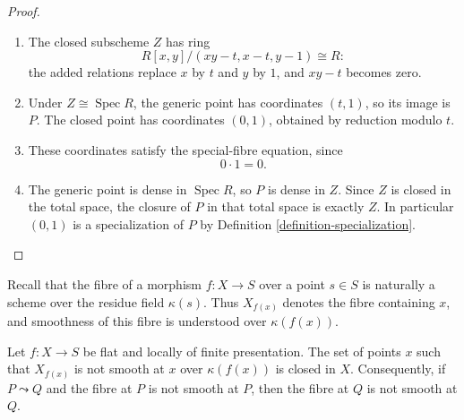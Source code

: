 \begin{proof}
\begin{enumerate}
To connect this with the definition of
the residue field, localizing at $P$
inverts every $g\notin\mathfrak{m}_P$,
that is, every $g$ with $g(t,1)\neq0$.
Evaluation therefore extends to
$$
B_{\mathfrak{m}_P}\longrightarrow K,
\qquad
\frac{f}{g}\longmapsto
\frac{f(t,1)}{g(t,1)}.
$$
This map is surjective, since constants
already give all of $K$.
Its value is zero exactly when
$f(t,1)=0$, or $f\in\mathfrak{m}_P$.
Its kernel is therefore
$\mathfrak{m}_P B_{\mathfrak{m}_P}$.
Thus
$$
\begin{aligned}
\kappa(P)
&=B_{\mathfrak{m}_P}/
  \mathfrak{m}_P B_{\mathfrak{m}_P}\\
&\cong B/\mathfrak{m}_P
\cong K.
\end{aligned}
$$
Localizing can change the ring, but
does not change this quotient:
the denominators already become
nonzero, hence invertible, elements
of the field $K$.
\item The closed subscheme $Z$ has ring
$$
R[x,y]/(xy-t,x-t,y-1)\cong R:
$$
the added relations replace $x$ by $t$
and $y$ by $1$, and $xy-t$ becomes zero.
\item Under $Z\cong\operatorname{Spec}R$,
the generic point has coordinates
$(t,1)$, so its image is $P$.
The closed point has coordinates
$(0,1)$, obtained by reduction modulo
$t$.
\item These coordinates satisfy the
special-fibre equation, since
$$
0\cdot1=0.
$$
\item The generic point is dense in
$\operatorname{Spec}R$, so $P$ is dense
in $Z$.
Since $Z$ is closed in the total space,
the closure of $P$ in that total space
is exactly $Z$.
In particular $(0,1)$ is a
specialization of $P$ by Definition
\ref{definition-specialization}.
\end{enumerate}
\end{proof}



\noindent
Recall that the fibre of a morphism
$f:X\to S$ over a point $s\in S$
is naturally a scheme over the residue
field $\kappa(s)$.
Thus $X_{f(x)}$ denotes the fibre
containing $x$, and smoothness of this
fibre is understood over $\kappa(f(x))$.

\begin{proposition}
\label{proposition-nonsmooth-specializes}
Let $f:X\to S$ be flat and locally of
finite presentation.
The set of points $x$ such that
$X_{f(x)}$ is not smooth at $x$ over
$\kappa(f(x))$ is closed in $X$.
Consequently, if $P\leadsto Q$ and
the fibre at $P$ is not smooth at $P$,
then the fibre at $Q$ is not smooth
at $Q$.
\end{proposition}

